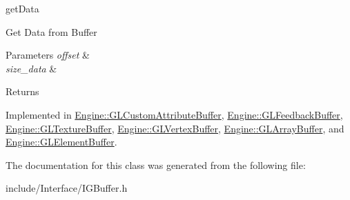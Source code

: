 get\+Data 

Get Data from Buffer 
\begin{DoxyParams}{Parameters}
{\em offset} & \\
\hline
{\em size\+\_\+data} & \\
\hline
\end{DoxyParams}
\begin{DoxyReturn}{Returns}

\end{DoxyReturn}


Implemented in \hyperlink{classEngine_1_1GLCustomAttributeBuffer_a828a015ce58e25c6422505f0cadfd799}{Engine\+::\+G\+L\+Custom\+Attribute\+Buffer}, \hyperlink{classEngine_1_1GLFeedbackBuffer_a8c4b82243c6652f377d7511ade32e7b5}{Engine\+::\+G\+L\+Feedback\+Buffer}, \hyperlink{classEngine_1_1GLTextureBuffer_a20a3044796531245f0c0926fdda52872}{Engine\+::\+G\+L\+Texture\+Buffer}, \hyperlink{classEngine_1_1GLVertexBuffer_ad62200d5611e256f2f1df87d13bc9651}{Engine\+::\+G\+L\+Vertex\+Buffer}, \hyperlink{classEngine_1_1GLArrayBuffer_a6ca4905a31d11d291df25abbfe95f177}{Engine\+::\+G\+L\+Array\+Buffer}, and \hyperlink{classEngine_1_1GLElementBuffer_a78842b1b2910f198665096b72186a1be}{Engine\+::\+G\+L\+Element\+Buffer}.



The documentation for this class was generated from the following file\+:\begin{DoxyCompactItemize}
\item 
include/\+Interface/I\+G\+Buffer.\+h\end{DoxyCompactItemize}
